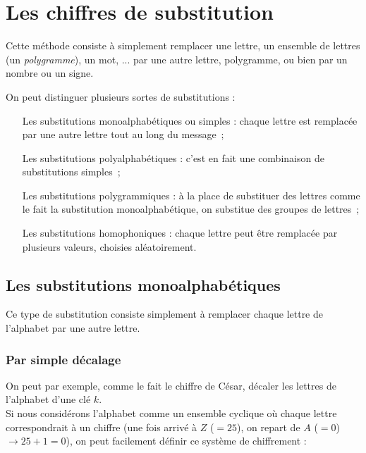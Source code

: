 \section{Les chiffres de substitution}
Cette méthode consiste à simplement remplacer une lettre, un ensemble
de lettres (un \emph{polygramme}), un mot, ...  par une autre lettre,
polygramme, ou bien par un nombre ou un signe.

On peut distinguer plusieurs sortes de substitutions : 
\begin{itemize}
  \renewcommand{\makelabel}[1]{\sffamily\textbf{#1}}
  \item[Les substitutions monoalphabétiques ou simples] : 
    chaque lettre est remplacée par une autre lettre tout au long du message~; 
  \item[Les substitutions polyalphabétiques] :
    c'est en fait une combinaison de substitutions simples~;
  \item[Les substitutions polygrammiques]: 
    à la place de substituer des lettres comme le fait la substitution
    monoalphabétique, on substitue des groupes de lettres~;
  \item[Les substitutions homophoniques] : 
    chaque lettre peut être remplacée par plusieurs valeurs, choisies
    aléatoirement.
\end{itemize}

\subsection{Les substitutions monoalphabétiques}
Ce type de substitution consiste simplement à remplacer chaque lettre
de l'alphabet par une autre lettre.

\subsubsection{Par simple décalage}
On peut par exemple, comme le fait le chiffre de
César, décaler les lettres de l'alphabet d'une
clé $k$. \\

 Si nous considérons l'alphabet comme un ensemble cyclique où 
chaque lettre correspondrait à un chiffre (une fois arrivé à $Z$ ($= 25$), on 
repart de $A$ ($= 0$) $\rightarrow 25 + 1 = 0$), on peut facilement définir 
ce système de chiffrement :  \\


